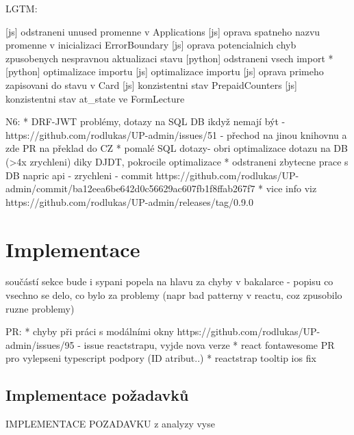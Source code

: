 LGTM: 

[js] odstraneni unused promenne v Applications
[js] oprava spatneho nazvu promenne v inicializaci ErrorBoundary
[js] oprava potencialnich chyb zpusobenych nespravnou aktualizaci stavu
[python] odstraneni vsech import *
[python] optimalizace importu
[js] optimalizace importu
[js] oprava primeho zapisovani do stavu v Card
[js] konzistentni stav PrepaidCounters
[js] konzistentni stav at\_state ve FormLecture



N6:
* DRF-JWT problémy, dotazy na SQL DB ikdyž nemají být - https://github.com/rodlukas/UP-admin/issues/51 - přechod na jinou knihovnu a zde PR na překlad do CZ
* pomalé SQL dotazy- obri optimalizace dotazu na DB (>4x zrychleni) diky DJDT, pokrocile optimalizace
* odstraneni zbytecne prace s DB napric api - zrychleni - commit https://github.com/rodlukas/UP-admin/commit/ba12eea6be642d0c56629ac607fb1f8ffab267f7
* vice info viz https://github.com/rodlukas/UP-admin/releases/tag/0.9.0

\chapter{Implementace}
součástí sekce bude i sypani popela na hlavu za chyby v bakalarce - popisu co vsechno se delo, co bylo za problemy (napr bad patterny v reactu, coz zpusobilo ruzne problemy)

PR:
* chyby při práci s modálními okny https://github.com/rodlukas/UP-admin/issues/95 - issue reactstrapu, vyjde nova verze
* react fontawesome PR pro vylepseni typescript podpory (ID atribut..)
* reactstrap tooltip ios fix

\section{Implementace požadavků}
IMPLEMENTACE POZADAVKU z analyzy vyse

